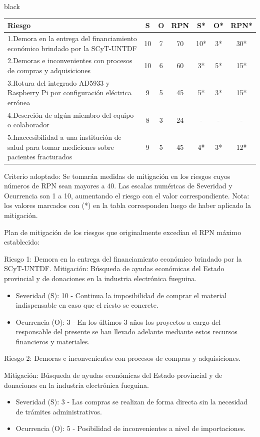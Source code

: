 \documentclass[11pt]{charter}
\begin{document}
\begin{consigna}{black}
\begin{table}[H]
\centering
\begin{tabularx}{\linewidth}{@{}|X|c|c|c|c|c|c|@{}}
\hline
\rowcolor[HTML]{C0C0C0} 
Riesgo & S & O & RPN & S* & O* & RPN* \\ \hline
1.Demora en la entrega del financiamiento económico brindado por la SCyT-UNTDF & 10 & 7 & 70 & 10* & 3* & 30* \\ \hline
2.Demoras e inconvenientes con procesos de compras y adquisiciones & 10 & 6 & 60 & 3* & 5* & 15* \\ \hline
3.Rotura del integrado AD5933  y Raspberry Pi por configuración eléctrica errónea & 9 & 5 & 45 & 5* & 3* & 15* \\ \hline
4.Deserción de algún miembro del equipo o colaborador & 8 & 3 & 24 &  -  &  -  &     - \\ \hline
5.Inaccesibilidad a una institución de salud para tomar mediciones sobre pacientes fracturados & 9 & 5 & 45 & 4* & 3* & 12* \\ \hline
\end{tabularx}%
\end{table}

Criterio adoptado: 
Se tomarán medidas de mitigación en los riesgos cuyos números de RPN sean mayores a 40. Las escalas numéricas de Severidad y Ocurrencia son 1 a 10, aumentando el riesgo con el valor correspondiente. Nota: los valores marcados con (*) en la tabla corresponden luego de haber aplicado la mitigación.

Plan de mitigación de los riesgos que originalmente excedían el RPN máximo establecido:
 
Riesgo 1: Demora en la entrega del financiamiento económico brindado por la SCyT-UNTDF.
Mitigación: Búsqueda de ayudas económicas del Estado provincial y de donaciones en la industria electrónica fueguina.
\begin{itemize}
\item Severidad (S): 10 - Continua la imposibilidad de comprar el material indispensable en caso que el riesto se concrete.
\item Ocurrencia (O): 3 - En los últimos 3 años los proyectos a cargo del responsable del presente se han llevado adelante mediante estos recursos financieros y materiales.
\end{itemize}

Riesgo 2: Demoras e inconvenientes con procesos de compras y adquisiciones.

Mitigación: Búsqueda de ayudas económicas del Estado provincial y de donaciones en la industria electrónica fueguina.
\begin{itemize}
\item Severidad (S): 3 - Las compras se realizan de forma directa sin la necesidad de trámites administrativos.
\item Ocurrencia (O): 5 - Posibilidad de inconvenientes a nivel de importaciones.
\end{itemize}


\end{consigna}
\end{document}
